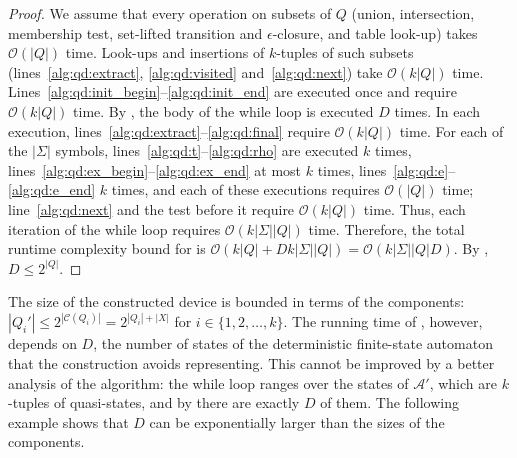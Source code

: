   \begin{proof}
    We assume that every operation on subsets of $Q$ (union, intersection, membership
    test, set-lifted transition and $\epsilon$-closure, and table look-up) takes
    $\mathcal{O}(|Q|)$ time. Look-ups and insertions of $k$-tuples of such subsets
    (lines~\ref{alg:qd:extract}, \ref{alg:qd:visited} and~\ref{alg:qd:next}) take
    $\mathcal{O}(k |Q|)$ time.
    Lines~\ref{alg:qd:init_begin}--\ref{alg:qd:init_end} are executed once and require
    $\mathcal{O}(k |Q|)$ time.
    By , the body of the while loop is executed $D$
    times. In each execution, lines~\ref{alg:qd:extract}--\ref{alg:qd:final} require
    $\mathcal{O}(k |Q|)$ time. For each of the $|\Sigma|$ symbols,
    lines~\ref{alg:qd:t}--\ref{alg:qd:rho} are executed $k$ times,
    lines~\ref{alg:qd:ex_begin}--\ref{alg:qd:ex_end} at most $k$ times,
    lines~\ref{alg:qd:e}--\ref{alg:qd:e_end} $k$ times, and each of these executions
    requires $\mathcal{O}(|Q|)$ time; line~\ref{alg:qd:next} and the test before it
    require $\mathcal{O}(k |Q|)$ time. Thus, each iteration of the while loop requires
    $\mathcal{O}(k |\Sigma| |Q|)$ time. Therefore, the total runtime complexity bound
    for  is $\mathcal{O}(k |Q| + D k |\Sigma| |Q|) =
    \mathcal{O}(k |\Sigma| |Q| D)$. By , $D \leq
    2^{|Q|}$.
  \end{proof}

  The size of the constructed device is bounded in terms of the components:
  $|Q_i'| \leq 2^{|\mathcal{C}(Q_i)|} = 2^{|Q_i| + |X|}$ for $i \in \{ 1, 2, \ldots, k
  \}$. The running time of , however, depends on $D$, the
  number of states of the deterministic finite-state automaton that the construction
  avoids representing. This cannot be improved by a better analysis of the algorithm:
  the while loop ranges over the states of $\mathcal{A}'$, which are $k$-tuples of
  quasi-states, and by  there are exactly $D$ of them.
  The following example shows that $D$ can be exponentially larger than the sizes of
  the components.


